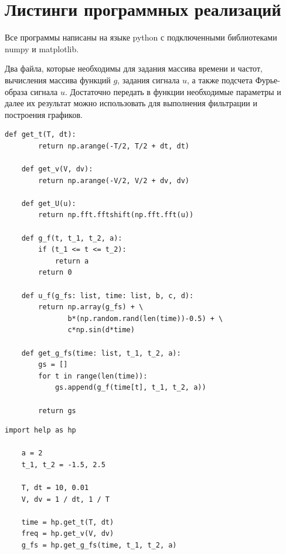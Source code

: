 \documentclass[a4paper, 12pt]{article}
\begin{document}
    
    \section{Листинги программных реализаций}
    Все программы написаны на языке python с подключенными библиотеками numpy и matplotlib.

    
    Два файла, которые необходимы для задания массива времени и частот, вычисления массива функций $g$, задания
    сигнала $u$, а также подсчета Фурье-образа сигнала $u$. Достаточно передать в функции необходимые параметры и
    далее их результат можно использовать для выполнения фильтрации и построения графиков.
    \begin{lstlisting}[label=l1, caption={Файл help.py. Вспомогательные функции}]
    def get_t(T, dt):
        return np.arange(-T/2, T/2 + dt, dt)   
        
    def get_v(V, dv):
        return np.arange(-V/2, V/2 + dv, dv)
          
    def get_U(u):
        return np.fft.fftshift(np.fft.fft(u))
        
    def g_f(t, t_1, t_2, a):
        if (t_1 <= t <= t_2):
            return a
        return 0
        
    def u_f(g_fs: list, time: list, b, c, d):
        return np.array(g_fs) + \
               b*(np.random.rand(len(time))-0.5) + \
               c*np.sin(d*time)
        
    def get_g_fs(time: list, t_1, t_2, a):
        gs = []
        for t in range(len(time)):
            gs.append(g_f(time[t], t_1, t_2, a))
        
        return gs   
    \end{lstlisting}
    \begin{lstlisting}[label=l2, caption={Файл static.py. Вспомогательные переменные}]
    import help as hp

    a = 2
    t_1, t_2 = -1.5, 2.5

    T, dt = 10, 0.01
    V, dv = 1 / dt, 1 / T

    time = hp.get_t(T, dt)
    freq = hp.get_v(V, dv)
    g_fs = hp.get_g_fs(time, t_1, t_2, a)
    \end{lstlisting}
\end{document}

